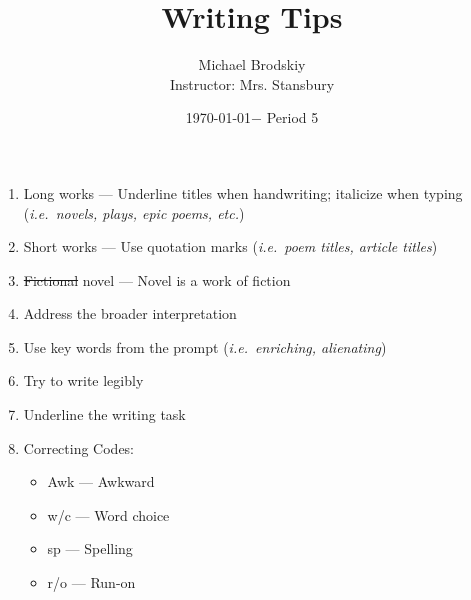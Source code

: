 \documentclass[12pt]{article}
\title{Writing Tips}
\date{\today $-$ Period 5}
\author{Michael Brodskiy\\ \small Instructor: Mrs. Stansbury}
\begin{document}
\maketitle

\begin{enumerate}

  \item Long works — Underline titles when handwriting; italicize when typing (\textit{i.e.\ novels, plays, epic poems, etc.})

  \item Short works — Use quotation marks (\textit{i.e.\ poem titles, article titles})

  \item \st{Fictional} novel — Novel is a work of fiction

  \item Address the broader interpretation

  \item Use key words from the prompt (\textit{i.e.\ enriching, alienating})

  \item Try to write legibly

  \item Underline the writing task

  \item Correcting Codes:

    \begin{itemize}

      \item Awk — Awkward

      \item w/c — Word choice

      \item sp — Spelling

      \item r/o — Run-on

    \end{itemize}

\end{enumerate}
\end{document}
